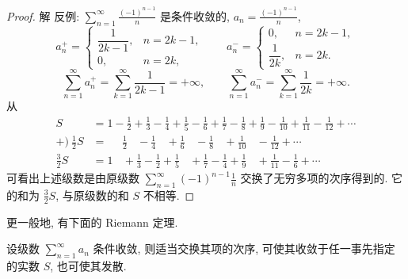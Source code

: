 \begin{proof}
解 反例: $\sum_{n=1}^{\infty}\frac{(-1)^{n-1}}{n}$ 是条件收敛的, $a_{n}=\frac{(-1)^{n-1}}{n}$,
\[
  a_{n}^{+}=\left\{\begin{matrix}
    \dfrac{1}{2k-1}, & n=2k-1,\\[6pt]
    0, & n=2k,
  \end{matrix}\right.
  \qquad
  a_{n}^{-}=\left\{\begin{matrix}
    0, & n=2k-1,\\[6pt]
    \dfrac{1}{2k}, & n=2k.
  \end{matrix}\right.
\]
\[
  \sum_{n=1}^{\infty}a_{n}^{+}=\sum_{k=1}^{\infty}\frac{1}{2k-1}=+\infty,
  \qquad
  \sum_{n=1}^{\infty}a_{n}^{-}=\sum_{k=1}^{\infty}\frac{1}{2k}=+\infty.
\]
从
\[
\begin{aligned}
  S&=1-\frac{1}{2}+\frac{1}{3}-\frac{1}{4}+\frac{1}{5}-\frac{1}{6}
     +\frac{1}{7}-\frac{1}{8}+\frac{1}{9}-\frac{1}{10}+\frac{1}{11}-\frac{1}{12}+\cdots\\
  +\Bigr)\ \frac{1}{2}S&=\ \ \ \ \ \ \frac{1}{2}\ \ \ \ -\frac{1}{4}\ \ \ \ +\frac{1}{6}\ \ \ \ -\frac{1}{8}\ \ \ \ +\frac{1}{10}\ \ \ \ -\frac{1}{12}+\cdots\\
  \hline
  \frac{3}{2}S&=1\ \ \ \ +\frac{1}{3}-\frac{1}{2}+\frac{1}{5}\ \ \ \ +\frac{1}{7}-\frac{1}{4}
     +\frac{1}{9}\ \ \ \ +\frac{1}{11}-\frac{1}{6}+\cdots
\end{aligned}
\]
可看出上述级数是由原级数 $\sum_{n=1}^{\infty}(-1)^{n-1}\frac{1}{n}$ 交换了无穷多项的次序得到的. 它的和为 $\frac{3}{2}S$, 与原级数的和 $S$ 不相等.
\end{proof}

更一般地, 有下面的 Riemann 定理.

\begin{theorem}\label{thm:12.3.7}
设级数 $\sum_{n=1}^{\infty}a_{n}$ 条件收敛, 则适当交换其项的次序, 可使其收敛于任一事先指定的实数 $S$, 也可使其发散.
\end{theorem}

